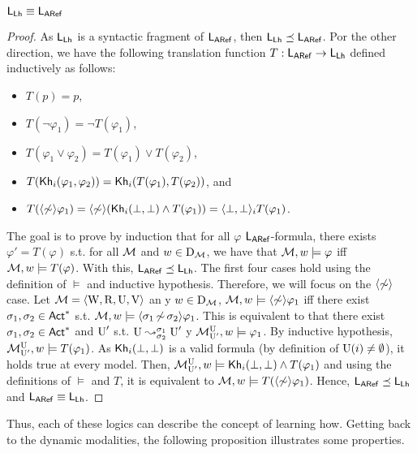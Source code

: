 \begin{proposition}\label{prop:lhequivaref}
$\LHlogic \equiv \AReflogic$
\end{proposition}
\begin{proof}
As $\LHlogic$ is a syntactic fragment of $\AReflogic$, then $\LHlogic \preceq \AReflogic$.
Por the other direction, we have the following translation function $T: \AReflogic \to \LHlogic$ defined inductively as follows:
\begin{itemize}
\item $T(p) = p$,
\item $T(\neg \varphi_1) = \neg T(\varphi_1)$,
\item $T(\varphi_1 \vee \varphi_2) = T(\varphi_1) \vee T(\varphi_2)$,
\item $T(\khi(\varphi_1, \varphi_2)) = \khi(T(\varphi_1), T(\varphi_2))$, and
\item $T(\arefdiam \varphi_1) = \arefdiam (\khi(\bot,\bot) \wedge T(\varphi_1)) = \lh{\bot}{\bot}_i T(\varphi_1)$.
\end{itemize}

The goal is to prove by induction that for all $\varphi$ $\AReflogic$-formula, there exists $\varphi' = T(\varphi)$ s.t. for all \ults $\modults$ and $w \in \D{\modults}$, we have that $\modults,w \models \varphi$ iff $\modults,w \models T(\varphi)$.
With this, $\AReflogic \preceq \LHlogic$. The first four cases hold using the definition of $\models$ and inductive hypothesis. Therefore, we will focus on the $\arefdiam$ case.
Let $\modults = \tup{\W,\R,\Unc,\V}$ an \ults y $w \in \D{\modults}$, $\modults,w \models \arefdiam \varphi_1$ iff there exist $\plan_1,\plan_2 \in \ACT^*$ s.t. $\modults,w \models \refdiam{\plan_1}{\plan_2}\varphi_1$.
This is equivalent to that there exist $\plan_1,\plan_2 \in \ACT^*$ and $\Unc'$ s.t. $\splitstr{\Unc}{\Unc'}{\plan_1}{\plan_2}$ y $\modults^{\Unc}_{\Unc'},w \models \varphi_1$.
By inductive hypothesis, $\modults^{\Unc}_{\Unc'},w \models T(\varphi_1)$.
As $\khi(\bot,\bot)$ is a valid formula (by definition of $\Unc(i) \neq \emptyset$), it holds true at every model.
Then, $\modults^{\Unc}_{\Unc'},w \models \khi(\bot, \bot) \wedge T(\varphi_1)$ and using the definitions of $\models$ and $T$, it is equivalent to $\modults,w \models T(\arefdiam \varphi_1)$.
Hence, $\AReflogic \preceq \LHlogic$ and $\AReflogic \equiv \LHlogic$.
\end{proof}

Thus, each of these logics can describe the concept of learning how.
Getting back to the dynamic modalities, the following proposition illustrates some properties.

